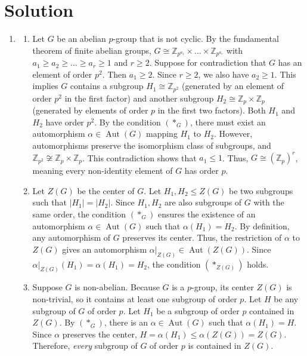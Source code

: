 \documentclass{article}
\begin{document}
\section*{Solution}
\begin{enumerate}[label=\fbox{\arabic*}]
  \item %
        \begin{enumerate}[label=(\roman*)]
          \item Let $G$ be an abelian $p$-group that is not cyclic. By the fundamental theorem of finite abelian groups, $G \cong \mathbb{Z}_{p^{a_1}} \times \dots \times \mathbb{Z}_{p^{a_r}}$ with $a_1 \ge a_2 \ge \dots \ge a_r \ge 1$ and $r \ge 2$.
          Suppose for contradiction that $G$ has an element of order $p^2$. Then $a_1 \ge 2$. Since $r \ge 2$, we also have $a_2 \ge 1$.
          This implies $G$ contains a subgroup $H_1 \cong \mathbb{Z}_{p^2}$ (generated by an element of order $p^2$ in the first factor) and another subgroup $H_2 \cong \mathbb{Z}_p \times \mathbb{Z}_p$ (generated by elements of order $p$ in the first two factors).
          Both $H_1$ and $H_2$ have order $p^2$. By the condition $(*_{G})$, there must exist an automorphism $\alpha \in \operatorname{Aut}(G)$ mapping $H_1$ to $H_2$. However, automorphisms preserve the isomorphism class of subgroups, and $\mathbb{Z}_{p^2} \not\cong \mathbb{Z}_p \times \mathbb{Z}_p$.
          This contradiction shows that $a_1 \le 1$. Thus, $G \cong (\mathbb{Z}_p)^r$, meaning every non-identity element of $G$ has order $p$.

          \item Let $Z(G)$ be the center of $G$. Let $H_1, H_2 \le Z(G)$ be two subgroups such that $|H_1| = |H_2|$.
          Since $H_1, H_2$ are also subgroups of $G$ with the same order, the condition $(*_{G})$ ensures the existence of an automorphism $\alpha \in \operatorname{Aut}(G)$ such that $\alpha(H_1) = H_2$.
          By definition, any automorphism of $G$ preserves its center. Thus, the restriction of $\alpha$ to $Z(G)$ gives an automorphism $\alpha|_{Z(G)} \in \operatorname{Aut}(Z(G))$.
          Since $\alpha|_{Z(G)}(H_1) = \alpha(H_1) = H_2$, the condition $(*_{Z(G)})$ holds.

          \item Suppose $G$ is non-abelian. Because $G$ is a $p$-group, its center $Z(G)$ is non-trivial, so it contains at least one subgroup of order $p$.
          Let $H$ be any subgroup of $G$ of order $p$. Let $H_1$ be a subgroup of order $p$ contained in $Z(G)$.
          By $(*_{G})$, there is an $\alpha \in \operatorname{Aut}(G)$ such that $\alpha(H_1) = H$.
          Since $\alpha$ preserves the center, $H = \alpha(H_1) \le \alpha(Z(G)) = Z(G)$. Therefore, \textit{every} subgroup of $G$ of order $p$ is contained in $Z(G)$.
          

\end{enumerate}
\end{enumerate}
\end{document}
